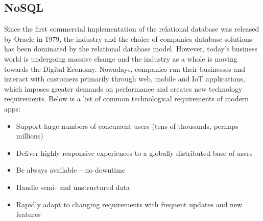 \subsection{NoSQL}
Since the first commercial implementation of the relational database was released by Oracle in 1979, the industry and the choice of companies database solutions has been dominated by the relational database model.
However, today’s business world is undergoing massive change and the industry as a whole is moving towards the Digital Economy. Nowadays, companies run their businesses and interact with customers primarily through web, mobile  and IoT applications, which imposes greater demands on performance and creates new technology requirements. 
Below is a list of common technological requirements of modern apps:\\

\begin{itemize}
  \item Support large numbers of concurrent users (tens of thousands, perhaps millions)
  \item Deliver highly responsive experiences to a globally distributed base of users
  \item Be always available – no downtime
  \item Handle semi- and unstructured data
  \item Rapidly adapt to changing requirements with frequent updates and new features\\
\end{itemize}


